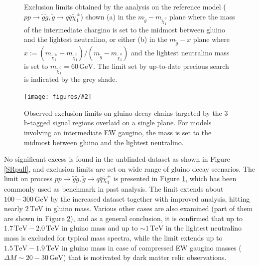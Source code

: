 \documentclass {article}
\newcommand{\tev}{\, \mathrm{TeV}}
\newcommand{\gev}{\, \mathrm{GeV}}
\newcommand{\tchic}{\tilde{\chi}_{1}^{\pm}}
\newcommand{\tLSP}{\tilde{\chi}_{1}^{0}}
\newcommand{\ra}{\rightarrow}
\newcommand{\tg}{\tilde{g}}
\newcommand{\fig}[4][width=15cm]{
	\begin{figure}[H]
		 \centering
			 \texttt{[image: figures/\#2]}
		 \caption{#3}
		 \label{#4}
	 \end{figure}}
\begin{document}
\begin{figure}[h]
  \centering
    \caption{ Exclusion limits obtained by the analysis on the reference model ($pp \ra \tg\tg,  \tg \ra q\bar{q} \tchic$) shown 
  (a) in the $m_{\tg}-m_{\tLSP}$ plane where the mass of the intermediate chargino is set to the midmost between gluino and the lightest neutralino, or either 
  (b) in the $m_{\tg}-x$ plane where $x:= (m_{\tchic}-m_{\tLSP})/(m_{\tg}-m_{\tLSP})$ and the lightest neutralino mass is set to $m_{\tLSP}=60\gev$. 
  The limit set by up-to-date precious search \cite{2016ICHEP} is indicated by the grey shade.
  \label{limit_symQQC1} }
\end{figure}


\fig[160]{3B_x12_obs.eps}
{Observed exclusion limits on gluino decay chains targeted by the 3 b-tagged signal regions overlaid on a single plane. 
For models involving an intermediate EW gaugino, the mass is set to the midmost between gluino and the lightest neutralino.}
{combLimit}

No significant excess is found in the unblinded dataset as shown in Figure \ref{SRpull}, and exclusion limits are set on wide range of gluino decay scenarios. 
The limit on process $pp \ra \tg\tg,  \tg \ra q\bar{q} \tchic$ is presented in Figure \ref{limit_symQQC1}, which has been commonly used as benchmark in past analysis.
The limit extends about $100-300\gev$ by the increased dataset together with improved analysis, hitting nearly $2\tev$ in gluino mass. 
Various other cases are also examined (part of them are shown in Figure \ref{combLimit}), and as a general conclusion, 
it is confirmed that up to $1.7\tev - 2.0 \tev$ in gluino mass and up to $\sim 1\tev$ in the lightest neutralino mass is excluded for typical mass spectra, 
while the limit extends up to $1.5\tev - 1.9 \tev$ in gluino mass in case of compressed EW gaugino masses ($\Delta M \sim 20-30\gev$) that is motivated by dark matter relic observations.
\end{document}
